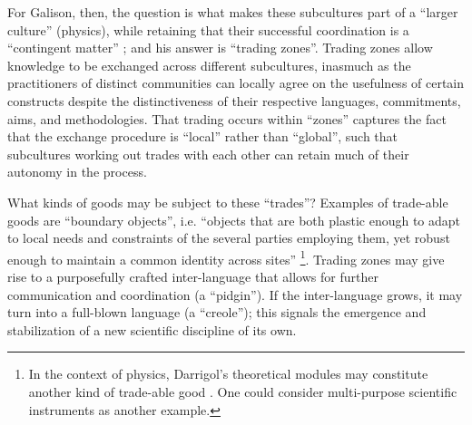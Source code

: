 \documentclass[smallextended]{svjour3}
\begin{document}
For Galison, then, the question is what makes these subcultures part of a ``larger culture'' (physics), %
while retaining that their successful coordination is a ``contingent matter'' \citep[p.~18]{galison1997image}; and his answer is ``trading zones''. Trading zones allow knowledge to be exchanged across different subcultures, inasmuch as the practitioners of distinct communities can locally agree on the usefulness of certain constructs despite the distinctiveness of their respective languages, commitments, aims, and methodologies. That trading occurs within ``zones'' captures the fact that the exchange procedure is  ``local'' rather than ``global'', such that subcultures working out trades with each other can retain much of their autonomy in the process.%

What kinds of goods may be subject to these ``trades''? Examples of trade-able goods are ``boundary objects'', i.e. ``objects that are both plastic enough to adapt to local needs and constraints of the several parties employing them, yet robust enough to maintain a common identity across sites'' \citep[p.~393]{Star1989}\footnote{In the context of physics, Darrigol's theoretical modules may constitute another kind of trade-able good \citep[p.~214]{Darrigol2007}. One could consider multi-purpose scientific instruments \citep[pp.~179--182]{Shinn2005} as another example.}. Trading zones may give rise to a purposefully crafted inter-language that allows for further communication and coordination (a ``pidgin''). If the inter-language grows, it may turn into a full-blown language (a ``creole''); this signals the emergence and stabilization of a new scientific discipline of its own. 
\end{document}
